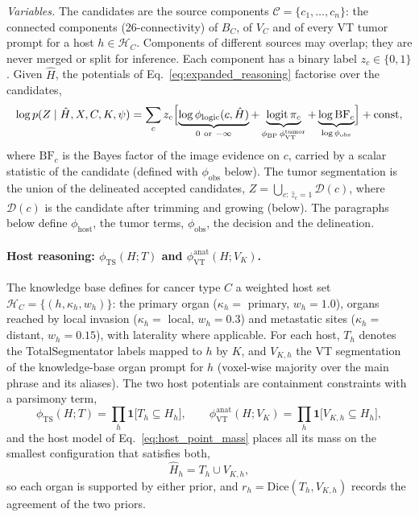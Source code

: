 \documentclass[fleqn,10pt]{olplainarticle}
\begin{document}
\textit{Variables.} The candidates are the source components $\mathcal{C}=\{c_1,\dots,c_n\}$: the connected components
(26-connectivity) of $B_C$, of $V_C$ and of every VT tumor prompt for a host $h\in\mathcal{H}_C$. Components of different
sources may overlap; they are never merged or split for inference. Each component has a binary label $z_c\in\{0,1\}$.
Given $\hat H$, the potentials of Eq.~\eqref{eq:expanded_reasoning} factorise over the candidates,
\begin{equation}
\label{eq:part_posterior}
\log p(Z\mid \hat H,X,C,K,\psi) = \sum_{c} z_c\Bigl[\underbrace{\log\phi_{\mathrm{logic}}(c,\hat H)}_{0\ \text{or}\ -\infty}
+\underbrace{\operatorname{logit}\pi_c}_{\phi_{\mathrm{BP}}\,\phi^{\mathrm{tumor}}_{\mathrm{VT}}}
+\underbrace{\log \mathrm{BF}_c}_{\log\phi_{\mathrm{obs}}}\Bigr] + \mathrm{const},
\end{equation}
where $\mathrm{BF}_c$ is the Bayes factor of the image evidence on $c$, carried by a scalar statistic of the candidate
(defined with $\phi_{\mathrm{obs}}$ below). The tumor segmentation is the union of the delineated accepted candidates,
$Z=\bigcup_{c:\,\hat z_c=1}\mathcal{D}(c)$, where $\mathcal{D}(c)$ is the candidate after trimming and growing (below).
The paragraphs below define $\phi_{\mathrm{host}}$, the tumor terms, $\phi_{\mathrm{obs}}$, the decision and the
delineation.

\paragraph{Host reasoning: $\phi_{\mathrm{TS}}(H;T)$ and $\phi^{\mathrm{anat}}_{\mathrm{VT}}(H;V_K)$.}
The knowledge base defines for cancer type $C$ a weighted host set $\mathcal{H}_C=\{(h,\kappa_h,w_h)\}$: the primary organ
($\kappa_h=$ primary, $w_h=1.0$), organs reached by local invasion ($\kappa_h=$ local, $w_h=0.3$) and metastatic sites
($\kappa_h=$ distant, $w_h=0.15$), with laterality where applicable. For each host, $T_h$ denotes the TotalSegmentator
labels mapped to $h$ by $K$, and $V_{K,h}$ the VT segmentation of the knowledge-base organ prompt for $h$ (voxel-wise
majority over the main phrase and its aliases). The two host potentials are containment constraints with a parsimony
term,
\begin{equation}
\label{eq:host_potentials}
\phi_{\mathrm{TS}}(H;T)=\prod_{h}\mathbf{1}\bigl[T_h\subseteq H_h\bigr],\qquad
\phi^{\mathrm{anat}}_{\mathrm{VT}}(H;V_K)=\prod_{h}\mathbf{1}\bigl[V_{K,h}\subseteq H_h\bigr],
\end{equation}
and the host model of Eq.~\eqref{eq:host_point_mass} places all its mass on the smallest configuration that satisfies
both,
\begin{equation}
\label{eq:host_map}
\hat H_h = T_h\cup V_{K,h},
\end{equation}
so each organ is supported by either prior, and $r_h=\mathrm{Dice}(T_h,V_{K,h})$ records the agreement of the two priors.
\end{document}

